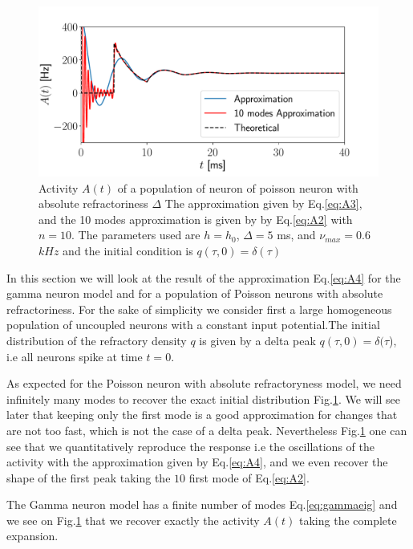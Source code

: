 \documentclass[12pt,twoside]{report}
\begin{document}
\begin{figure}[h!]
	\centering
	\includegraphics[width=0.8\linewidth]{delta_poisson.pdf}
	\caption{Activity $A(t)$ of a population of neuron of poisson neuron with absolute refractoriness $\Delta$ The approximation given by Eq.\eqref{eq:A3}, and the 10 modes approximation is given by  by Eq.\eqref{eq:A2} with $n=10$. The parameters used are $h=h_0$, $\Delta=5$ ms, and $\nu_{max}=0.6$ $kHz$  and the initial condition is $q(\tau,0)=\delta(\tau)$}
	\label{fig:delta_poisson}
\end{figure}

In this section we will look at the result of the approximation Eq.\eqref{eq:A4} for the gamma  neuron model and for a population of Poisson neurons with absolute refractoriness. For the sake of simplicity we consider first a large homogeneous population of uncoupled neurons with a constant input potential.The initial distribution of the refractory density $q$ is given by a delta peak $q(\tau,0)=\delta(\tau$), i.e all neurons spike at time $t=0$.

As expected for the Poisson neuron with absolute refractoryness model, we need infinitely many modes to recover the exact initial distribution Fig.\ref{fig:delta_poisson}. We will see later that keeping only the first mode is a good approximation for changes that are not too fast, which is not the case of a delta peak. Nevertheless  Fig.\ref{fig:delta_poisson} one can see that we quantitatively reproduce the response i.e the oscillations of the activity with the approximation given by Eq.\eqref{eq:A4}, and we even recover the shape of the first peak taking the $10$ first mode of Eq.\eqref{eq:A2}.

The Gamma neuron model has a finite number of modes Eq.\eqref{eq:gammaeig} and we see on Fig.\ref{fig:delta_poisson} that we recover exactly the activity $A(t)$ taking the complete expansion.
\end{document}

